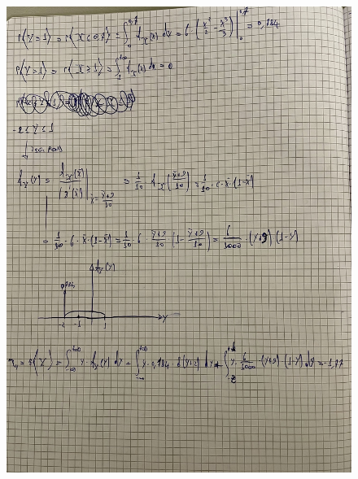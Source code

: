 \documentclass{article}
\begin{document}
\begin{figure}[ht]
\centering
\includegraphics[scale=0.10]{ese/34a.jpeg}
\end{figure}
\end{document}
